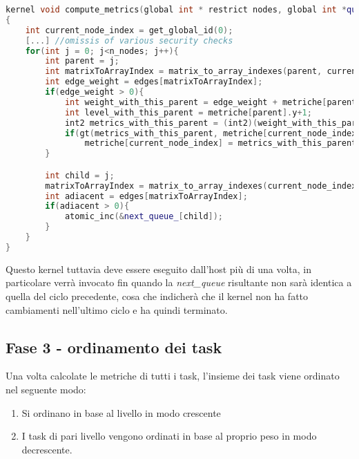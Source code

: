 \documentclass[../relazione.tex]{subfiles}
\begin{document}
\begin{lstlisting}[language=C++, caption={Compute metrics kernel},captionpos=b]
kernel void compute_metrics(global int * restrict nodes, global int *queue_, global int *next_queue_, const int n_nodes, global edge_t* restrict edges, volatile global int2 *metriche /*<RANK,LIVELLO>*/)
{
	int current_node_index = get_global_id(0);
	[...] //omissis of various security checks
	for(int j = 0; j<n_nodes; j++){
		int parent = j;
		int matrixToArrayIndex = matrix_to_array_indexes(parent, current_node_index, n_nodes);
		int edge_weight = edges[matrixToArrayIndex]; 
		if(edge_weight > 0){
			int weight_with_this_parent = edge_weight + metriche[parent].x + nodes[current_node_index];
			int level_with_this_parent = metriche[parent].y+1;
			int2 metrics_with_this_parent = (int2)(weight_with_this_parent, level_with_this_parent);
			if(gt(metrics_with_this_parent, metriche[current_node_index]))
				metriche[current_node_index] = metrics_with_this_parent;
		}

		int child = j;
		matrixToArrayIndex = matrix_to_array_indexes(current_node_index, child, n_nodes);
		int adiacent = edges[matrixToArrayIndex];
		if(adiacent > 0){
			atomic_inc(&next_queue_[child]);
		}
	}
}
\end{lstlisting}

Questo kernel tuttavia deve essere eseguito dall'host più di una volta, in particolare verrà invocato fin quando la \textit{next\_queue} risultante non sarà identica a quella del ciclo precedente, cosa che indicherà che il kernel non ha fatto cambiamenti nell'ultimo ciclo e ha quindi terminato.

\subsection{Fase 3 - ordinamento dei task}
Una volta calcolate le metriche di tutti i task, l'insieme dei task viene ordinato nel seguente modo:
\begin{enumerate}
    \item Si ordinano in base al livello in modo crescente
    \item I task di pari livello vengono ordinati in base al proprio peso in modo decrescente.
\end{enumerate}
\end{document}
